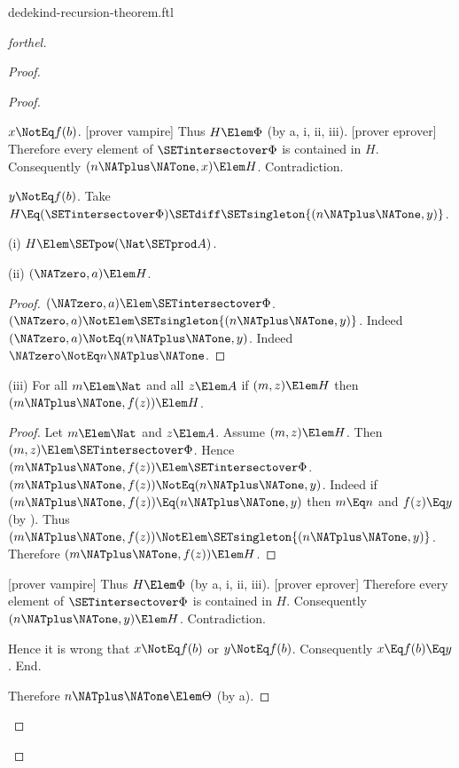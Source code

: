\documentclass{stex}
\begin{document}
\begin{smodule}{dedekind-recursion-theorem.ftl}
\begin{proof}[forthel]
\begin{proof}
\begin{proof}
\begin{case}{$x \NotEq f(b)$.}
          [prover vampire]
          Thus $H \Elem \Phi$ (by a, i, ii, iii).
          [prover eprover]
          Therefore every element of $\SETintersectover \Phi$ is contained in $H$.
          Consequently $(n \NATplus \NATone,x) \Elem H$.
          Contradiction.
        \end{case}

        \begin{case}{$y \NotEq f(b)$.}
          Take $H \Eq (\SETintersectover \Phi) \SETdiff \SETsingleton{(n \NATplus \NATone,y)}$.

          (i) $H \Elem \SETpow(\Nat \SETprod A)$.

          (ii) $(\NATzero,a) \Elem H$.
          \begin{proof}
            $(\NATzero,a) \Elem \SETintersectover \Phi$.
            $(\NATzero,a) \NotElem \SETsingleton{(n \NATplus \NATone,y)}$.
            Indeed $(\NATzero,a) \NotEq (n \NATplus \NATone,y)$.
            Indeed $\NATzero \NotEq n \NATplus \NATone$.
          \end{proof}

          (iii) For all $m \Elem \Nat$ and all $z \Elem A$ if $(m,z) \Elem H$ then $(m \NATplus \NATone,f(z)) \Elem H$.
          \begin{proof}
            Let $m \Elem \Nat$ and $z \Elem A$.
            Assume $(m,z) \Elem H$.
            Then $(m,z) \Elem \SETintersectover \Phi$.
            Hence $(m \NATplus \NATone,f(z)) \Elem \SETintersectover \Phi$.
            $(m \NATplus \NATone,f(z)) \NotEq (n \NATplus \NATone,y)$.
            Indeed if $(m \NATplus \NATone,f(z)) \Eq (n \NATplus \NATone,y)$ then $m \Eq n$ and $f(z) \Eq y$ (by ).
            Thus $(m \NATplus \NATone,f(z)) \NotElem \SETsingleton{(n \NATplus \NATone,y)}$.
            Therefore $(m \NATplus \NATone,f(z)) \Elem H$.
          \end{proof}

          [prover vampire]
          Thus $H \Elem \Phi$ (by a, i, ii, iii).
          [prover eprover]
          Therefore every element of $\SETintersectover \Phi$ is contained in $H$.
          Consequently $(n \NATplus \NATone,y) \Elem H$.
          Contradiction.
        \end{case}

        Hence it is wrong that $x \NotEq f(b)$ or $y \NotEq f(b)$.
        Consequently $x \Eq f(b) \Eq y$.
      End.

      Therefore $n \NATplus \NATone \Elem \Theta$ (by a).
    \end{proof}


\end{proof}
\end{proof}
\end{smodule}
\end{document}
